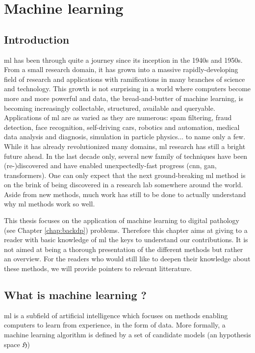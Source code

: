 \chapter{Machine learning}
\label{chap:backml}

\section{Introduction}
\label{sec:backml:intro}

\acrlong{ml} has been through quite a journey since its inception in the 1940s and 1950s. From a small research domain, it has grown into a massive rapidly-developing field of research and applications with ramifications in many branches of science and technology. This growth is not surprising in a world where computers become more and more powerful and data, the bread-and-butter of machine learning, is becoming increasingly collectable, structured, available and queryable. Applications of \acrshort{ml} are as varied as they are numerous: spam filtering, fraud detection, face recognition, self-driving cars, robotics and automation, medical data analysis and diagnosis, simulation in particle physics... to name only a few. While it has already revolutionized many domains, \acrshort{ml} research has still a bright future ahead. In the last decade only, several new family of techniques have been (re-)discovered and have enabled unexpectedly-fast progress (\eg \acrlong{cnn}, \acrlong{gan}, transformers). One can only expect that the next ground-breaking \acrshort{ml} method is on the brink of being discovered in a research lab somewhere around the world. Aside from new methods, much work has still to be done to actually understand why \acrshort{ml} methods work so well. 

This thesis focuses on the application of machine learning to digital pathology (see Chapter \ref{chap:backdp}) problems. Therefore this chapter aims at giving to a reader with basic knowledge of \acrshort{ml} the keys to understand our contributions. It is not aimed at being a thorough presentation of the different methods but rather an overview. For the readers who would still like to deepen their knowledge about these methods, we will provide pointers to relevant litterature.  

\section{What is machine learning ?} 
\label{sec:backml:whatisml}

\acrlong{ml} is a subfield of artificial intelligence which focuses on methods enabling computers to learn from experience, in the form of data. More formally, a machine learning algorithm is defined by a set of candidate models (\ie an hypothesis space $\mathfrak{H}$) 


\section{}